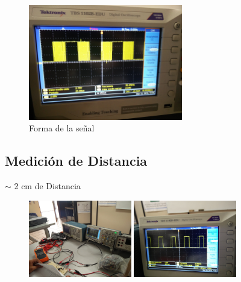 \documentclass[12pt, fleqn]{article}                            %
\theoremstyle{break}                                            %
\begin{document}
        \begin{figure}[h]
            \centering
            \includegraphics[width=0.6\textwidth]{Signal2}
            \caption{Forma de la señal}
        \end{figure}


    \clearpage
    \subsection{Medición de Distancia}

        $\sim$ 2 cm de Distancia
        \begin{figure}[h]
            \includegraphics[width=0.4\textwidth]{1Distance}
            \includegraphics[width=0.4\textwidth]{1Signal}
        \end{figure}
\end{document}
